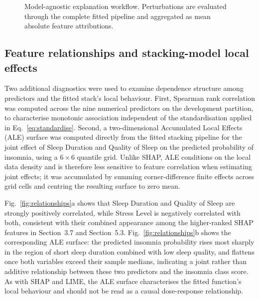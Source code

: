 \documentclass{elektr}
\begin{document}
\begin{figure}[t]
\centering
{}
\caption{Model-agnostic explanation workflow. Perturbations are evaluated through the complete fitted pipeline and aggregated as mean absolute feature attributions.}
\label{fig:shap}
\end{figure}

\FloatBarrier

\subsection{Feature relationships and stacking-model local effects}
\label{sec:ale}
Two additional diagnostics were used to examine dependence structure among predictors and the fitted stack's local behaviour. First, Spearman rank correlation was computed across the nine numerical predictors on the development partition, to characterise monotonic association independent of the standardisation applied in Eq.~\eqref{eq:standardise}. Second, a two-dimensional Accumulated Local Effects (ALE) surface was computed directly from the fitted stacking pipeline for the joint effect of Sleep Duration and Quality of Sleep on the predicted probability of insomnia, using a $6\times6$ quantile grid. Unlike SHAP, ALE conditions on the local data density and is therefore less sensitive to feature correlation when estimating joint effects; it was accumulated by summing corner-difference finite effects across grid cells and centring the resulting surface to zero mean.

Fig.~\ref{fig:relationships}a shows that Sleep Duration and Quality of Sleep are strongly positively correlated, while Stress Level is negatively correlated with both, consistent with their combined appearance among the higher-ranked SHAP features in Section~3.7 and Section~5.3. Fig.~\ref{fig:relationships}b shows the corresponding ALE surface: the predicted insomnia probability rises most sharply in the region of short sleep duration combined with low sleep quality, and flattens once both variables exceed their sample medians, indicating a joint rather than additive relationship between these two predictors and the insomnia class score. As with SHAP and LIME, the ALE surface characterises the fitted function's local behaviour and should not be read as a causal dose-response relationship.
\end{document}
